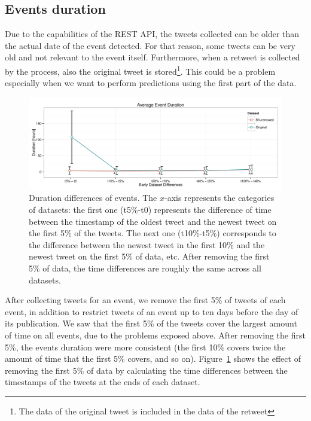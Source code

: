 \subsection{Events duration}\label{sub:dur}

Due to the capabilities of the REST API, the tweets collected can be older than
the actual date of the event detected. 
%
For that reason, some tweets can be very old and not relevant to the event
itself. 
%
Furthermore, when a retweet is collected by the process, also the original tweet
is stored\footnote{The data of the original tweet is included in the data of the
retweet}. 
%
This could be a problem especially when we want to perform predictions using the
first part of the data. 


\begin{figure}
\centering
\includegraphics[width=\textwidth]{figures/data/duration-differences.pdf}
\caption[Duration differences of events.]{Duration differences of events. The
  $x$-axis represents the categories of datasets: the first one (t5\%-t0)
  represents the difference of time between the timestamp of the oldest tweet
  and the newest tweet on the first 5\% of the tweets. The next one (t10\%-t5\%)
  corresponds to the difference between the newest tweet in the first 10\% and
  the newest tweet on the first 5\% of data, etc. After removing the first 5\%
  of data, the time differences are roughly the same across all
  datasets.}\label{fig:duration-differences}

\end{figure}

After collecting tweets for an event, we remove the first 5\% of tweets of each
event, in addition to restrict tweets of an event up to ten days before the day
of its publication. 
%
We saw that the first 5\% of the tweets cover the largest amount of time on all
events, due to the problems exposed above. 
%
After removing the first 5\%, the events duration were more consistent (the
first 10\% covers twice the amount of time that the first 5\% covers, and so
on). 
%
Figure~\ref{fig:duration-differences} shows the effect of removing the first 5\%
of data by calculating the time differences between the timestamps of the tweets
at the ends of each dataset.


